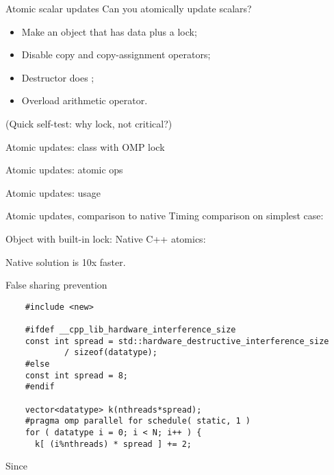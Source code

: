 \begin{numberedframe}{Atomic scalar updates}
  Can you atomically update scalars?
  \begin{itemize}
  \item Make an object that has data plus a lock;
  \item Disable copy and copy-assignment operators;
  \item Destructor does ;
  \item Overload arithmetic operator.
  \end{itemize}
  (Quick self-test: why lock, not critical?)
\end{numberedframe}

\begin{numberedframe}{Atomic updates: class with OMP lock}
\end{numberedframe}

\begin{numberedframe}{Atomic updates: atomic ops}
\end{numberedframe}

\begin{numberedframe}{Atomic updates: usage}
\end{numberedframe}

\begin{numberedframe}{Atomic updates, comparison to native}
  Timing comparison on simplest case:
\begin{multicols}{2}
  \let\snippetoutputsize\scriptsize
  Object with built-in lock:
\columnbreak
Native C++ atomics:
\end{multicols}

  Native solution is 10x faster.

\end{numberedframe}

\begin{numberedframe}{False sharing prevention}
  \begin{lstlisting}
    #include <new>

    #ifdef __cpp_lib_hardware_interference_size
    const int spread = std::hardware_destructive_interference_size
            / sizeof(datatype);
    #else
    const int spread = 8;
    #endif

    vector<datatype> k(nthreads*spread);
    #pragma omp parallel for schedule( static, 1 )
    for ( datatype i = 0; i < N; i++ ) {
      k[ (i%nthreads) * spread ] += 2;
  \end{lstlisting}
  Since 
\end{numberedframe}

